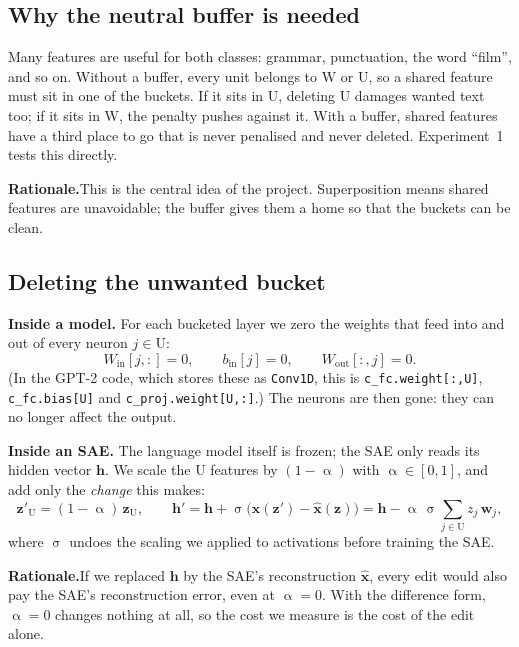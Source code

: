 \documentclass[11pt,a4paper]{article}
\theoremstyle{definition}
\newcommand{\Wb}{\mathrm{W}}
\newcommand{\Ub}{\mathrm{U}}
\newcommand{\why}[1]{\par\smallskip\noindent\textbf{Rationale.}\enspace #1\par}
\begin{document}
\subsection{Why the neutral buffer is needed}
Many features are useful for both classes: grammar, punctuation, the word ``film'', and so on.
Without a buffer, every unit belongs to $\Wb$ or $\Ub$, so a shared feature must sit in one of the
buckets. If it sits in $\Ub$, deleting $\Ub$ damages wanted text too; if it sits in $\Wb$, the
penalty pushes against it. With a buffer, shared features have a third place to go that is never
penalised and never deleted. Experiment~1 tests this directly.

\why{This is the central idea of the project. Superposition means shared features are unavoidable;
the buffer gives them a home so that the buckets can be clean.}

\subsection{Deleting the unwanted bucket}
\textbf{Inside a model.} For each bucketed layer we zero the weights that feed into and out of
every neuron $j\in\Ub$:
\begin{equation}
  W_{\mathrm{in}}[j,:]=0,\qquad b_{\mathrm{in}}[j]=0,\qquad W_{\mathrm{out}}[:,j]=0 .
\end{equation}
(In the GPT-2 code, which stores these as \texttt{Conv1D}, this is \texttt{c\_fc.weight[:,U]},
\texttt{c\_fc.bias[U]} and \texttt{c\_proj.weight[U,:]}.) The neurons are then gone: they can no
longer affect the output.

\textbf{Inside an SAE.} The language model itself is frozen; the SAE only reads its hidden vector
$\mathbf h$. We scale the $\Ub$ features by $(1-\upalpha)$ with $\upalpha\in[0,1]$, and add only the
\emph{change} this makes:
\begin{equation}
  \mathbf z'_{\Ub}=(1-\upalpha)\,\mathbf z_{\Ub},\qquad
  \mathbf h'=\mathbf h+\upsigma\big(\hat{\mathbf x}(\mathbf z')-\hat{\mathbf x}(\mathbf z)\big)
  =\mathbf h-\upalpha\,\upsigma\sum_{j\in\Ub}z_j\,\mathbf w_j ,
  \label{eq:delta}
\end{equation}
where $\upsigma$ undoes the scaling we applied to activations before training the SAE.

\why{If we replaced $\mathbf h$ by the SAE's reconstruction $\hat{\mathbf x}$, every edit would
also pay the SAE's reconstruction error, even at $\upalpha=0$. With the difference form,
$\upalpha=0$ changes nothing at all, so the cost we measure is the cost of the edit alone.}
\end{document}
